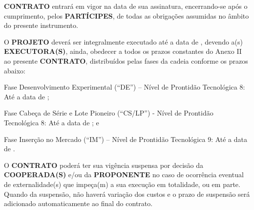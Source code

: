 

\xx \textbf{CONTRATO} entrará em vigor na data de sua assinatura, encerrando-se após o cumprimento, pelos \textbf{PARTÍCIPES}, de todas as obrigações assumidas no âmbito do presente instrumento.

\xx O \textbf{PROJETO} deverá ser integralmente executado até a data de \DataFimProjeto, devendo a(s) \textbf{EXECUTORA(S)}, ainda, obedecer a todos os prazos constantes do Anexo II ao presente \textbf{CONTRATO}, distribuídos pelas fases da cadeia conforme os prazos abaixo:

\xxx Fase Desenvolvimento Experimental (“DE”) – Nível de Prontidão Tecnológica 8: Até a data de \DataFimFaseDE;

\xxx Fase Cabeça de Série e Lote Pioneiro (“CS/LP”) - Nível de Prontidão Tecnológica 8: Até a data de \DataFimFaseCS; e

\xxx Fase Inserção no Mercado (“IM”) – Nível de Prontidão Tecnológica 9: Até a data de \DataFimFaseIM.

\xx O \textbf{CONTRATO} poderá ter sua vigência suspensa por decisão da \textbf{COOPERADA(S)} e/ou da \textbf{PROPONENTE} no caso de ocorrência eventual de externalidade(s) que impeça(m) a sua execução em totalidade, ou em parte. Quando da suspensão, não haverá variação dos custos e o prazo de suspensão será adicionado automaticamente ao final do contrato.

